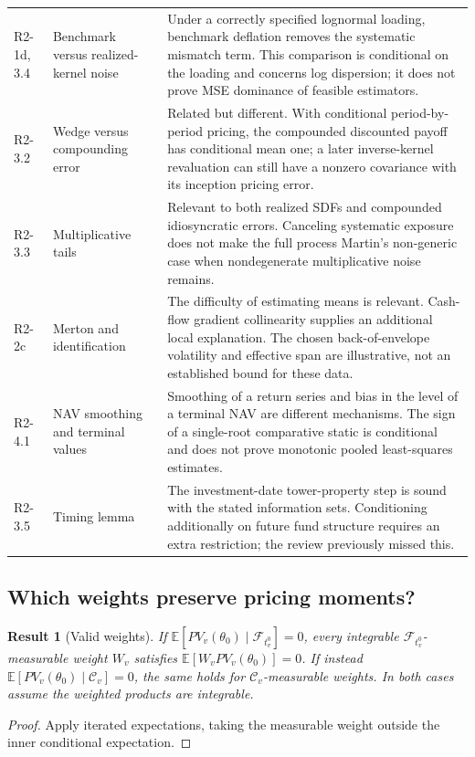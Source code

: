 \documentclass[11pt]{article}
\newcommand{\E}{\mathbb{E}}
\theoremstyle{plain}
\newtheorem{result}{Result}[section]
\theoremstyle{definition}
\begin{document}
{\begin{longtable}{@{}L{1.7cm}L{5.0cm}L{8.6cm}@{}}
R2-1d, 3.4 & Benchmark versus realized-kernel noise & Under a correctly specified lognormal loading, benchmark deflation removes the systematic mismatch term. This comparison is conditional on the loading and concerns log dispersion; it does not prove MSE dominance of feasible estimators.\\
R2-3.2 & Wedge versus compounding error & Related but different. With conditional period-by-period pricing, the compounded discounted payoff has conditional mean one; a later inverse-kernel revaluation can still have a nonzero covariance with its inception pricing error.\\
R2-3.3 & Multiplicative tails & Relevant to both realized SDFs and compounded idiosyncratic errors. Canceling systematic exposure does not make the full process Martin's non-generic case when nondegenerate multiplicative noise remains.\\
R2-2c & Merton and identification & The difficulty of estimating means is relevant. Cash-flow gradient collinearity supplies an additional local explanation. The chosen back-of-envelope volatility and effective span are illustrative, not an established bound for these data.\\
R2-4.1 & NAV smoothing and terminal values & Smoothing of a return series and bias in the level of a terminal NAV are different mechanisms. The sign of a single-root comparative static is conditional and does not prove monotonic pooled least-squares estimates.\\
R2-3.5 & Timing lemma & The investment-date tower-property step is sound with the stated information sets. Conditioning additionally on future fund structure requires an extra restriction; the review previously missed this.\\
\bottomrule
\end{longtable}
}

\subsection{Which weights preserve pricing moments?}
\label{sec:auditB}

\begin{result}[Valid weights]
\label{res:instrument}
If $\E[PV_v(\theta_0)\mid\mathcal F_{t_v^0}]=0$, every integrable $\mathcal F_{t_v^0}$-measurable weight $W_v$ satisfies $\E[W_vPV_v(\theta_0)]=0$. If instead $\E[PV_v(\theta_0)\mid\mathcal C_v]=0$, the same holds for $\mathcal C_v$-measurable weights. In both cases assume the weighted products are integrable.
\end{result}
\begin{proof}
Apply iterated expectations, taking the measurable weight outside the inner conditional expectation.
\end{proof}
\end{document}
